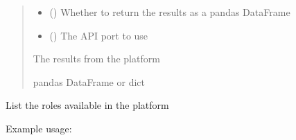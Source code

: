 \documentclass[letterpaper,10pt,english]{sphinxmanual}
\begin{document}
\begin{fulllineitems}
\begin{fulllineitems}
\begin{quote}
\begin{description}
\begin{itemize}
\item {} 
\sphinxAtStartPar
{} (\sphinxstyleliteralemphasis{\sphinxupquote{ (}}\sphinxstyleliteralemphasis{\sphinxupquote{)}}) \textendash{} Whether to return the results as a pandas DataFrame

\item {} 
\sphinxAtStartPar
{} (\sphinxstyleliteralemphasis{\sphinxupquote{ (}}\sphinxstyleliteralemphasis{\sphinxupquote{)}}) \textendash{} The API port to use

\end{itemize}

\sphinxAtStartPar
{} \textendash{} The results from the platform

\sphinxAtStartPar
pandas DataFrame or dict

\end{description}\end{quote}

\end{fulllineitems}


\begin{fulllineitems}
\label{\detokenize{aisquared.platform:aisquared.platform.AISquaredPlatformClient.AISquaredPlatformClient.list_roles}}
\pysigstartsignatures
{}
\pysigstopsignatures
\sphinxAtStartPar
List the roles available in the platform

\sphinxAtStartPar
Example usage:


\end{fulllineitems}
\end{fulllineitems}
\end{document}
